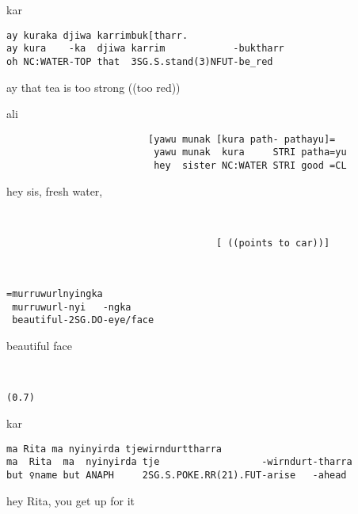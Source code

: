 \documentclass[output=paper,nonflat,colorlinks,citecolor=brown]{langsci/langscibook}
\begin{document}
\vspace{2mm}
%
\begin{transbox}{1}{kar}
\begin{verbatim}
ay kuraka djiwa karrimbuk[tharr.
ay kura    -ka  djiwa karrim            -buktharr
oh NC:WATER-TOP that  3SG.S.stand(3)NFUT-be_red
\end{verbatim}
ay that tea is too strong ((too red))
\end{transbox}
%
\begin{mdframednoverticalspace}[style=firstfoc]
\begin{transbox}{2}{ali}
\begin{verbatim}
                         [yawu munak [kura path- pathayu]=
                          yawu munak  kura     STRI patha=yu
                          hey  sister NC:WATER STRI good =CL
\end{verbatim}
\hspace{11.9em} hey sis, fresh water,
\end{transbox}
%
\begin{transbox}{3}{~}
\begin{verbatim}
                                     [ ((points to car))]
\end{verbatim}
\end{transbox}
%
\begin{transbox}{4}{~}
\begin{verbatim}
=murruwurlnyingka
 murruwurl-nyi   -ngka
 beautiful-2SG.DO-eye/face
\end{verbatim}
\hspace{0.07cm} beautiful face
\end{transbox}
\end{mdframednoverticalspace}\vspace{1mm}
%
\begin{transbox}{5}{~}
\begin{verbatim}
(0.7)
\end{verbatim}
\end{transbox}\vspace{-1mm}
%
\begin{mdframednoverticalspace}[style=secondfoc]
\begin{transbox}{6}{kar}
\begin{verbatim}
ma Rita ma nyinyirda tjewirndurttharra
ma  Rita  ma  nyinyirda tje                  -wirndurt-tharra
but ♀name but ANAPH     2SG.S.POKE.RR(21).FUT-arise   -ahead
\end{verbatim}
hey Rita, you get up for it
\end{transbox}
\end{mdframednoverticalspace}\bigskip
\end{document}
